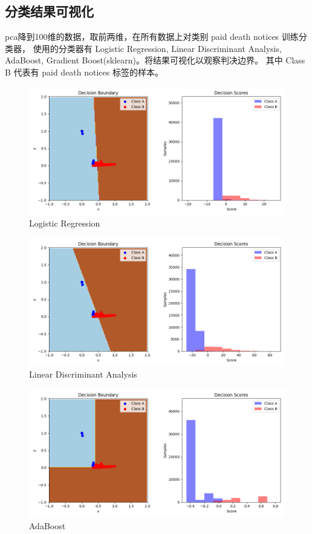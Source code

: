 \documentclass[12pt]{article}
\begin{document}
\subsection{分类结果可视化}
pca降到100维的数据，取前两维，在所有数据上对类别 paid death notices 训练分类器，
使用的分类器有 Logistic Regression,
Linear Discriminant Analysis, AdaBoost, Gradient Boost(sklearn)。将结果可视化以观察判决边界。
其中 Class B 代表有 paid death notices 标签的样本。\\
\begin{figure}[htbp]
\centering
\includegraphics[width=1.0\textwidth]{../lr.png}
\caption{Logistic Regression}
\label{fig:lr}
\end{figure}
\begin{figure}[htbp]
\centering
\includegraphics[width=1.0\textwidth]{../lda.png}
\caption{Linear Discriminant Analysis}
\label{fig:lda}
\end{figure}
\begin{figure}[htbp]
\centering
\includegraphics[width=1.0\textwidth]{../adaboost.png}
\caption{AdaBoost}
\label{fig:ada}
\end{figure}
\end{document}
